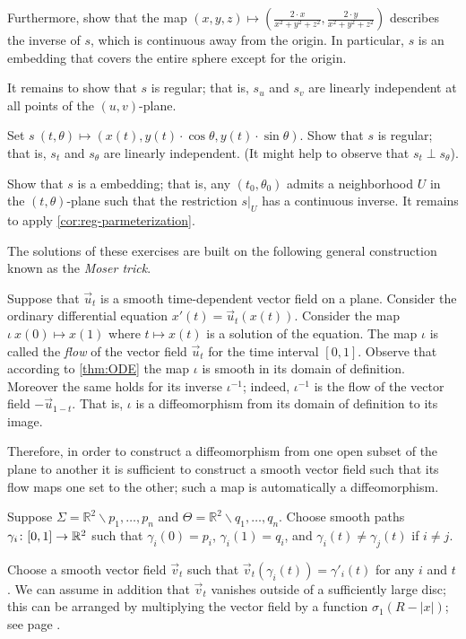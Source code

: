 Furthermore, show that the map $(x,y,z)\mapsto (\tfrac{2\cdot x}{x^2+y^2+z^2},\tfrac{2\cdot y}{x^2+y^2+z^2})$
describes the inverse of $s$, which is continuous away from the origin.
In particular, $s$ is an embedding that covers the entire sphere except for the origin.

It remains to show that $s$ is regular; that is, $s_u$ and $s_v$ are linearly independent at all points of the $(u,v)$-plane.

Set
$s\:(t,\theta)\mapsto (x(t), y(t)\cdot\cos\theta,y(t)\cdot\sin\theta)$.
Show that $s$ is regular; that is, $s_t$ and $s_\theta$ are linearly independent.
(It might help to observe that $s_t\perp s_\theta$).

Show that $s$ is a embedding; that is, any $(t_0,\theta_0)$ admits a neighborhood $U$ in the $(t,\theta)$-plane such that the restriction $s|_U$ has a continuous inverse.
It remains to apply \ref{cor:reg-parmeterization}.

The solutions of these exercises are built on the following general construction known as the \emph{Moser trick}.

Suppose that $\vec u_t$ is a smooth time-dependent vector field on a plane.
Consider the ordinary differential equation $x'(t)=\vec u_t(x(t))$.
Consider the map $\iota\:x(0)\mapsto x(1)$ where $t\mapsto x(t)$ is a solution of the equation.
The map $\iota$ is called the \emph{flow} of the vector field $\vec u_t$ for the time interval $[0,1]$.
Observe that according to \ref{thm:ODE} the map $\iota$ is smooth in its domain of definition.
Moreover the same holds for its inverse $\iota^{-1}$;
indeed, $\iota^{-1}$ is the flow of the vector field $-\vec u_{1-t}$.
That is, $\iota$ is a diffeomorphism from its domain of definition to its image. 


Therefore, in order to construct a diffeomorphism from one open subset of the plane to another it is sufficient to construct a smooth vector field such that its flow maps one set to the other;
such a map is automatically a diffeomorphism.


Suppose $\Sigma=\mathbb{R}^2\backslash{p_1,\dots,p_n}$ and $\Theta=\mathbb{R}^2\backslash{q_1,\dots,q_n}$.
Choose smooth paths $\gamma_i\:[0,1]\z\to \mathbb{R}^2$ such that $\gamma_i(0)=p_i$,
$\gamma_i(1)=q_i$, and $\gamma_i(t)\ne \gamma_j(t)$ if $i\ne j$.

Choose a smooth vector field $\vec v_t$ such that $\vec v_t(\gamma_i(t))=\gamma'_i(t)$ for any $i$ and $t$.
We can assume in addition that $\vec v_t$ vanishes outside of a sufficiently large disc; this can be arranged by  multiplying the vector field by a function 
$\sigma_1(R-|x|)$; see page \pageref{page:sigma-function}.


